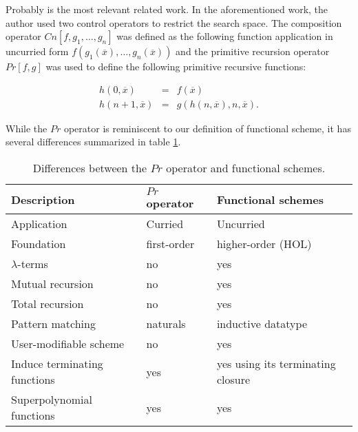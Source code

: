Probably \cite{kahrs2006genetic} is the most relevant related work. In the aforementioned work, the author used two control operators to restrict the search space. The composition operator $Cn[f, g_1, \ldots, g_n]$ was defined as the following function application in uncurried form $f(g_1(\overline{x}), \ldots, g_n(\overline{x}))$ and the primitive recursion operator $Pr[f,g]$ was used to define the following primitive recursive functions:

\begin{equation}
  \begin{array}{rcl}
    h(0,\overline{x}) & = & f(\overline{x})\\
    h(n+1,\overline{x}) & = & g(h(n,\overline{x}),n,\overline{x}).
  \end{array}
\end{equation}

While the $Pr$ operator is reminiscent to our definition of functional scheme, it has several differences summarized in table \ref{tab:related1}.

\begin{table}[ht!]
  \centering
  \begin{tabular}{llp{4cm}}
    \toprule
    Description & $Pr$ operator & Functional schemes\\
    \toprule
    Application & Curried & Uncurried\\
    Foundation & first-order & higher-order (HOL)\\
    $\lambda$-terms & no & yes\\
    Mutual recursion & no & yes\\
    Total recursion & no & yes\\
    Pattern matching & naturals & inductive datatype\\
    User-modifiable scheme & no & yes\\
    Induce terminating functions & yes & yes using its terminating closure\\
    Superpolynomial functions & yes & yes\\
    \bottomrule
  \end{tabular}
  \caption{Differences between the $Pr$ operator and functional schemes.}
  \label{tab:related1}
\end{table}

\cbend

